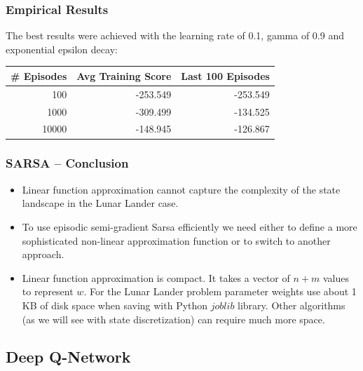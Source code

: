 \documentclass{beamer}
\begin{document}
\begin{frame}
\frametitle{Empirical Results}
The best results were 
achieved with the learning rate of 0.1, gamma of 0.9 and 
exponential epsilon decay: 

\begin{table}[H]
	\centering
	\begin{tabular}{|r|r|r|}
		\hline
		\multicolumn{1}{|l|}{\# Episodes} & \multicolumn{1}{l|}{Avg Training Score} & \multicolumn{1}{l|}{Last 100 Episodes} \\
		\hline
		100   & -253.549 & -253.549 \\
		\hline
		1000  & -309.499 & -134.525 \\
		\hline
		10000 & -148.945 & -126.867 \\
		\hline
	\end{tabular}%
\end{table}%
\end{frame}


\begin{frame}
\frametitle{SARSA -- Conclusion}


\begin{itemize}
	\item Linear function approximation 
	cannot capture the complexity
	of the state landscape in the Lunar Lander case.
	
	\item To use 
	episodic semi-gradient Sarsa efficiently we need either 
	to define a more sophisticated non-linear approximation function or to 
	switch to another approach.

	\item Linear function approximation is compact. It takes 
	a vector of $n+m$ values to represent $w$. For the Lunar Lander problem parameter weights use 
	about 1 KB of disk space when saving with Python $joblib$ library.
	Other algorithms (as we will see with state discretization) can 
	require much more space.

\end{itemize}
\end{frame}







\subsection{Deep Q-Network}
\end{document}

